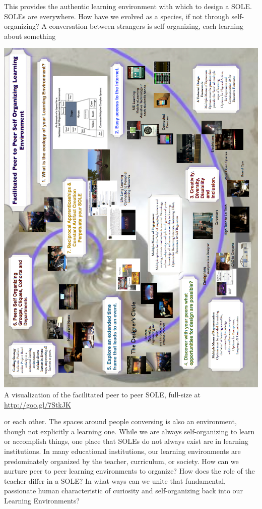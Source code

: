 This provides the authentic
learning environment with which to design a SOLE. SOLEs are everywhere.
How have we evolved as a species, if not through self-organizing? A
conversation between strangers is self organizing, each learning about
something 
\clearpage
\begin{vplace}[0.5]
\noindent \includegraphics[width=\textwidth]{../pictures/sole-l.jpg}
A visualization of the facilitated peer to peer SOLE, full-size
at \url{http://goo.gl/7StkJK}
\end{vplace}
\clearpage

\noindent or each other. The spaces around people conversing is also an
environment, though not explicitly a learning one. While we are always
self-organizing to learn or accomplish things, one place that SOLEs do
not always exist are in learning institutions. In many educational
institutions, our learning environments are predominately organized by
the teacher, curriculum, or society. How can we nurture peer to peer
learning environments to organize? How does the role of the teacher
differ in a SOLE? In what ways can we unite that fundamental, passionate
human characteristic of curiosity and self-organizing back into our
Learning Environments? 

